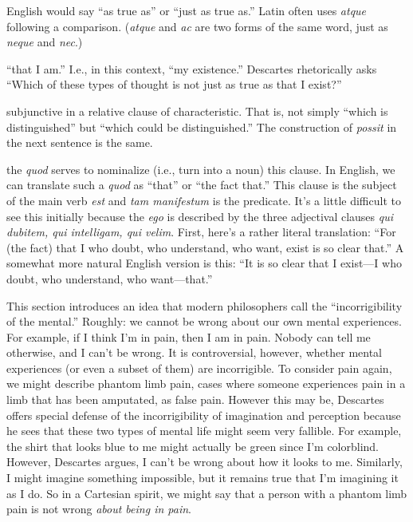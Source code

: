  English would say ``as true as'' or ``just as true as.'' Latin often uses \textit{atque} following a comparison. (\textit{atque} and \textit{ac} are two forms of the same word, just as \textit{neque} and \textit{nec}.)

 ``that I am.'' I.e., in this context, ``my existence.'' Descartes rhetorically asks ``Which of these types of thought is not just as true as that I exist?''

 subjunctive in a relative clause of characteristic. That is, not simply ``which is distinguished'' but ``which could be distinguished.'' The construction of \textit{possit} in the next sentence is the same.

 the \textit{quod} serves to nominalize (i.e., turn into a noun) this clause. In English, we can translate such a \textit{quod} as ``that'' or ``the fact that.'' This clause is the subject of the main verb \textit{est} and \textit{tam manifestum} is the predicate. It's a little difficult to see this initially because the \textit{ego} is described by the three adjectival clauses \textit{qui dubitem, qui intelligam, qui velim}. First, here's a rather literal translation: ``For (the fact) that I who doubt, who understand, who want, exist is so clear that.'' A somewhat more natural English version is this: ``It is so clear that I exist---I who doubt, who understand, who want---that.''

 This section introduces an idea that modern philosophers call the ``incorrigibility of the mental.'' Roughly: we cannot be wrong about our own mental experiences. For example, if I think I'm in pain, then I am in pain. Nobody can tell me otherwise, and I can't be wrong. It is controversial, however, whether mental experiences (or even a subset of them) are incorrigible. To consider pain again, we might describe phantom limb pain, cases where someone experiences pain in a limb that has been amputated, as false pain. However this may be, Descartes offers special defense of the incorrigibility of imagination and perception because he sees that these two types of mental life might seem very fallible. For example, the shirt that looks blue to me might actually be green since I'm colorblind. However, Descartes argues, I can't be wrong about how it looks to me. Similarly, I might imagine something impossible, but it remains true that I'm imagining it as I do. So in a Cartesian spirit, we might say that a person with a phantom limb pain is not wrong \textit{about being in pain}.

